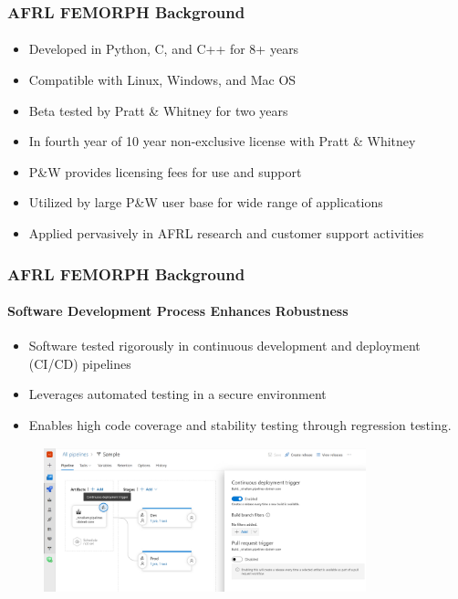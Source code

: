 \documentclass[t]{beamer}
\begin{document}
\begin{frame}
  \frametitle{AFRL FEMORPH Background}
  \framesubtitle{}
  
  \begin{itemize}
  \item Developed in Python, C, and C++ for 8+ years
  \item Compatible with Linux, Windows, and Mac OS
  \item Beta tested by Pratt \& Whitney for two years
  \item In fourth year of 10 year non-exclusive license with Pratt \& Whitney
  \item P\&W provides licensing fees for use and support
  \item Utilized by large P\&W user base for wide range of applications
  \item Applied pervasively in AFRL research and customer support activities
  \end{itemize}

\end{frame}


\begin{frame}
  \frametitle{AFRL FEMORPH Background}
  \framesubtitle{Software Development Process Enhances Robustness}

  \begin{itemize}
  \item Software tested rigorously in continuous development and deployment (CI/CD) pipelines
  \item Leverages automated testing in a secure environment
  \item Enables high code coverage and stability testing through regression testing.
  \end{itemize}

      \begin{figure}
       \includegraphics[height=1.65in]{./figures/ci-trigger.png}
      \end{figure}

\end{frame}
\end{document}
